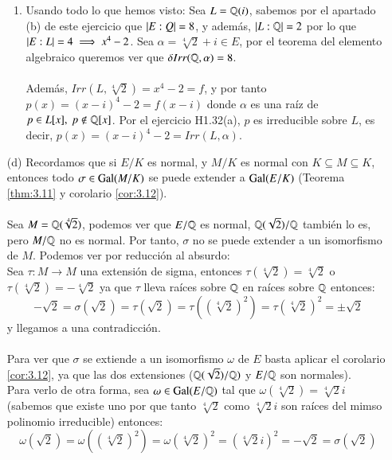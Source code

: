 \begin{ex}
\begin{itemize}
\begin{enumerate}
                \item Usando todo lo que hemos visto:
                Sea $L = \mathbb{Q}(i)$, sabemos por el apartado (b) de este ejercicio que $\left|E:Q\right| = 8$, y además, $\left|L:\mathbb{Q}\right| = 2$ por lo que $\left|E:L\right| = 4 \implies x^4-2$. Sea $\alpha = \sqrt[4]{2} + i \in E$, por el teorema del elemento algebraico queremos ver que $\delta Irr(\mathbb{Q}, \alpha) = 8$.\\\\
                Además, $Irr(L, \sqrt[4]{2}) = x^4 - 2 = f$, y por tanto $p(x) = (x-i)^4-2 = f(x-i)$ donde $\alpha$ es una raíz de $p \in L[x],\ p \notin \mathbb{Q}[x]$. Por el ejercicio H1.32(a), $p$ es irreducible sobre $L$, es decir, $p(x) = (x-i)^4-2 = Irr(L, \alpha)$.
            \end{enumerate}
        \item[(d)]
            Recordamos que si $E/K$ es normal, y $M/K$ es normal con $K \subseteq M \subseteq K$, entonces todo $\sigma \in \mathrm{Gal}(M/K)$ se puede extender a $\mathrm{Gal}(E/K)$ (Teorema \ref{thm:3.11} y corolario \ref{cor:3.12}).\\\\
            Sea $M = \mathbb{Q}(\sqrt[4]{2})$, podemos ver que $E/\mathbb{Q}$ es normal, $\mathbb{Q}(\sqrt{2})/\mathbb{Q}$ también lo es, pero $M/\mathbb{Q}$ no es normal. Por tanto, $\sigma$ no se puede extender a un isomorfismo de $M$. Podemos ver por reducción al absurdo:\\
            Sea $\tau: M \to M$ una extensión de sigma, entonces $\tau(\sqrt[4]{2}) = \sqrt[4]{2}$ o $\tau(\sqrt[4]{2}) = -\sqrt[4]{2}$ ya que $\tau$ lleva raíces sobre $\mathbb{Q}$ en raíces sobre $\mathbb{Q}$ entonces:
            $$
                -\sqrt{2} = \sigma(\sqrt 2) = \tau(\sqrt 2) = \tau((\sqrt[4]{2})^2) = \tau(\sqrt[4]{2})^2 = \pm \sqrt{2}
            $$
            y llegamos a una contradicción.\\\\

            Para ver que $\sigma$ se extiende a un isomorfismo $\omega$ de $E$ basta aplicar el corolario \ref{cor:3.12}, ya que las dos extensiones ($\mathbb{Q}(\sqrt 2)/\mathbb{Q})$ y $E/\mathbb{Q}$ son normales).\\
            Para verlo de otra forma, sea $\omega \in \mathrm{Gal}(E/\mathbb{Q})$ tal que $\omega(\sqrt[4]{2}) = \sqrt[4]{2} i$ (sabemos que existe uno por que tanto $\sqrt[4]{2}$ como $\sqrt[4]{2} i$ son raíces del mimso polinomio irreducible) entonces:
            $$
                \omega(\sqrt 2) = \omega((\sqrt[4]{2})^2) = \omega(\sqrt[4]{2})^2 = (\sqrt[4]{2} i)^2 = -\sqrt{2} = \sigma(\sqrt 2)
            $$
    \end{itemize}
\end{ex}

